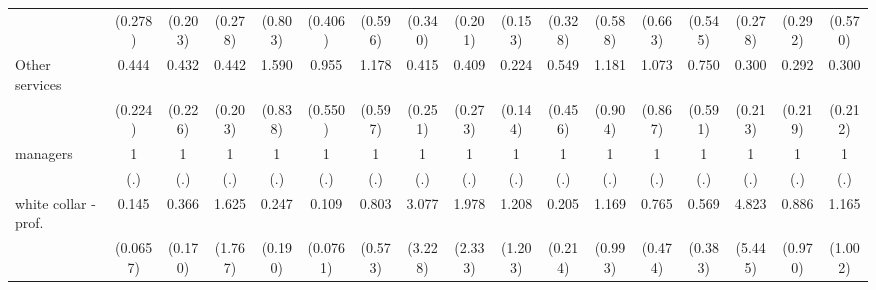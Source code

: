 {\begin{tabular}{l*{16}{c}}
                    &     (0.278)         &     (0.203)         &     (0.278)         &     (0.803)         &     (0.406)         &     (0.596)         &     (0.340)         &     (0.201)         &     (0.153)         &     (0.328)         &     (0.588)         &     (0.663)         &     (0.545)         &     (0.278)         &     (0.292)         &     (0.570)         \\
[1em]
Other services      &       0.444         &       0.432         &       0.442         &       1.590         &       0.955         &       1.178         &       0.415         &       0.409         &       0.224\sym{*}  &       0.549         &       1.181         &       1.073         &       0.750         &       0.300         &       0.292         &       0.300         \\
                    &     (0.224)         &     (0.226)         &     (0.203)         &     (0.838)         &     (0.550)         &     (0.597)         &     (0.251)         &     (0.273)         &     (0.144)         &     (0.456)         &     (0.904)         &     (0.867)         &     (0.591)         &     (0.213)         &     (0.219)         &     (0.212)         \\
[1em]
managers            &           1         &           1         &           1         &           1         &           1         &           1         &           1         &           1         &           1         &           1         &           1         &           1         &           1         &           1         &           1         &           1         \\
                    &         (.)         &         (.)         &         (.)         &         (.)         &         (.)         &         (.)         &         (.)         &         (.)         &         (.)         &         (.)         &         (.)         &         (.)         &         (.)         &         (.)         &         (.)         &         (.)         \\
[1em]
white collar - prof.&       0.145\sym{***}&       0.366\sym{*}  &       1.625         &       0.247         &       0.109\sym{**} &       0.803         &       3.077         &       1.978         &       1.208         &       0.205         &       1.169         &       0.765         &       0.569         &       4.823         &       0.886         &       1.165         \\
                    &    (0.0657)         &     (0.170)         &     (1.767)         &     (0.190)         &    (0.0761)         &     (0.573)         &     (3.228)         &     (2.333)         &     (1.203)         &     (0.214)         &     (0.993)         &     (0.474)         &     (0.383)         &     (5.445)         &     (0.970)         &     (1.002)         \\

\end{tabular}}
